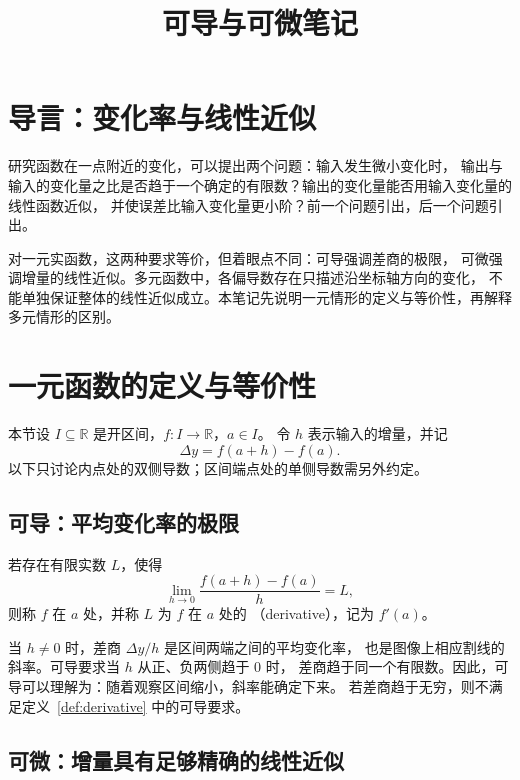 \documentclass{ctexart}
\title{可导与可微笔记}
\author{}
\date{}
\begin{document}
\maketitle

\section{导言：变化率与线性近似}
\label{sec:motivation}

研究函数在一点附近的变化，可以提出两个问题：输入发生微小变化时，
输出与输入的变化量之比是否趋于一个确定的有限数？输出的变化量能否用输入变化量的线性函数近似，
并使误差比输入变化量更小阶？前一个问题引出，后一个问题引出。

对一元实函数，这两种要求等价，但着眼点不同：可导强调差商的极限，
可微强调增量的线性近似。多元函数中，各偏导数存在只描述沿坐标轴方向的变化，
不能单独保证整体的线性近似成立。本笔记先说明一元情形的定义与等价性，再解释多元情形的区别。

\section{一元函数的定义与等价性}
\label{sec:one-variable}

本节设 $I\subseteq\mathbb R$ 是开区间，$f:I\to\mathbb R$，$a\in I$。
令 $h$ 表示输入的增量，并记
\[
  \Delta y=f(a+h)-f(a).
\]
以下只讨论内点处的双侧导数；区间端点处的单侧导数需另外约定。

\subsection{可导：平均变化率的极限}

\begin{definition}[导数与可导]
\label{def:derivative}
若存在有限实数 $L$，使得
\begin{equation}\label{eq:derivative}
  \lim_{h\to0}\frac{f(a+h)-f(a)}{h}=L,
\end{equation}
则称 $f$ 在 $a$ 处，并称 $L$ 为 $f$ 在 $a$ 处的
（derivative），记为 $f'(a)$。
\end{definition}

当 $h\ne0$ 时，差商 $\Delta y/h$ 是区间两端之间的平均变化率，
也是图像上相应割线的斜率。可导要求当 $h$ 从正、负两侧趋于 $0$ 时，
差商趋于同一个有限数。因此，可导可以理解为：随着观察区间缩小，斜率能确定下来。
若差商趋于无穷，则不满足定义~\ref{def:derivative} 中的可导要求。

\subsection{可微：增量具有足够精确的线性近似}
\end{document}
